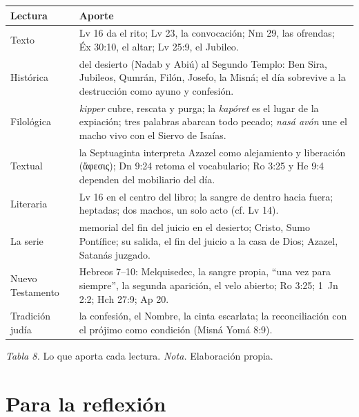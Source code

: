 \documentclass[11pt,letterpaper]{article}
\newcommand{\grc}[1]{\foreignlanguage{ancientgreek}{#1}}
\begin{document}
\begin{center}\small\renewcommand{\arraystretch}{1.2}
\begin{tabular}{@{}L{3.2cm}L{11.4cm}@{}}
\toprule
\textbf{Lectura} & \textbf{Aporte} \\ \midrule
Texto & Lv 16 da el rito; Lv 23, la convocación; Nm 29, las ofrendas; Éx 30:10, el altar; Lv 25:9, el Jubileo. \\
Histórica & del desierto (Nadab y Abiú) al Segundo Templo: Ben Sira, Jubileos, Qumrán, Filón, Josefo, la Misná; el día sobrevive a la destrucción como ayuno y confesión. \\
Filológica & \emph{kipper} cubre, rescata y purga; la \emph{kapóret} es el lugar de la expiación; tres palabras abarcan todo pecado; \emph{nasá avón} une el macho vivo con el Siervo de Isaías. \\
Textual & la Septuaginta interpreta Azazel como alejamiento y liberación (\grc{ἄφεσις}); Dn 9:24 retoma el vocabulario; Ro 3:25 y He 9:4 dependen del mobiliario del día. \\
Literaria & Lv 16 en el centro del libro; la sangre de dentro hacia fuera; heptadas; dos machos, un solo acto (cf. Lv 14). \\
La serie & memorial del fin del juicio en el desierto; Cristo, Sumo Pontífice; su salida, el fin del juicio a la casa de Dios; Azazel, Satanás juzgado. \\
Nuevo Testamento & Hebreos 7--10: Melquisedec, la sangre propia, ``una vez para siempre'', la segunda aparición, el velo abierto; Ro 3:25; 1~Jn 2:2; Hch 27:9; Ap 20. \\
Tradición judía & la confesión, el Nombre, la cinta escarlata; la reconciliación con el prójimo como condición (Misná Yomá 8:9). \\
\bottomrule
\end{tabular}\par
{\footnotesize\color{sepia}\textit{Tabla 8.} Lo que aporta cada lectura. \textit{Nota.} Elaboración propia.}
\end{center}

\section{Para la reflexión}
\end{document}
